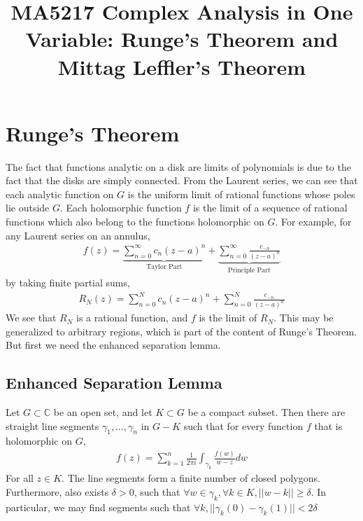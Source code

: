 \documentclass[11pt]{article}
\title{MA5217 Complex Analysis in One Variable: Runge's Theorem and Mittag Leffler's Theorem}
\author{}\date{}
\begin{document}
\maketitle
\section{Runge's Theorem}
The fact that functions analytic on a disk are limits of polynomials is due to the fact that the disks are simply connected.
From the Laurent series, we can see that each analytic function on $G$ is the uniform limit of rational functions whose poles
lie outside $G$. Each holomorphic function $f$ is the limit of a sequence of rational functions which also belong to the functions
holomorphic on $G$. For example, for any Laurent series on an annulus,
\[
\begin{aligned}
  f(z) = \underbrace{\sum_{n=0}^{\infty}c_n(z-a)^n}_{\text{Taylor Part}} +
  \underbrace{\sum_{n=0}^{\infty}\frac{c_{-n}}{(z-a)^n}}_{\text{Principle Part}}
\end{aligned}
\]
by taking finite partial sums,
\[
\begin{aligned}
R_N(z) = \sum_{n=0}^{N}c_n(z-a)^n + \sum_{n=0}^{N}\frac{c_{-n}}{(z-a)^n}
\end{aligned}
\]
We see that $R_N$ is a rational function, and $f$ is the limit of $R_N$. This may be generalized to
arbitrary regions, which is part of the content of Runge's Theorem. But first we need the enhanced
separation lemma.

\subsection{Enhanced Separation Lemma}
Let $G \subset \mathbb{C}$ be an open set, and let $K \subset G$ be a compact subset. Then there are straight line segments
$\gamma_1, \dots, \gamma_n$ in $G - K$ such that for every function $f$ that is holomorphic on $G$,
\[
\begin{aligned}
  f(z) = \sum_{k = 1}^{n} \frac{1}{2\pi i} \int_{\gamma_k} \frac{f(w)}{w-z}dw
\end{aligned}
\]
For all $z \in K$. The line segments form a finite number of closed polygons. Furthermore, also exists $\delta > 0$,
such that $\forall w \in \gamma_k,\forall k \in K, ||w - k|| \ge \delta$. In particular, we may find segments such that
$\forall k, ||\gamma_k(0) - \gamma_k(1)|| < 2 \delta$
\end{document}
